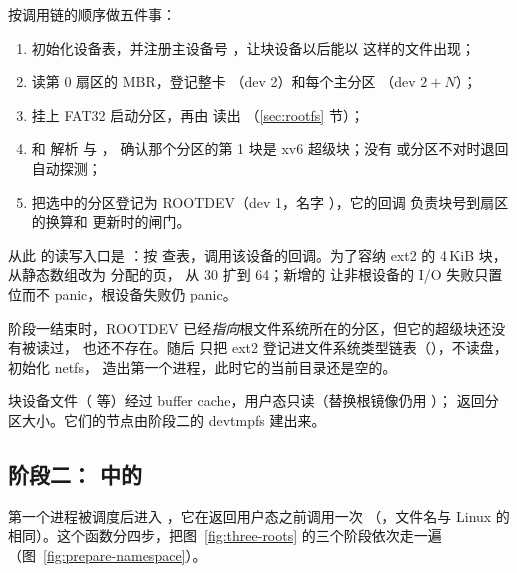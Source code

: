  按调用链的顺序做五件事：

\begin{enumerate}
  \item {} 初始化设备表，并注册主设备号 ，让块设备以后能以  这样的文件出现；
  \item 读第 0 扇区的 MBR，登记整卡 （dev 2）和每个主分区 （dev $2+N$）；
  \item 挂上 FAT32 启动分区，再由  读出 （\ref{sec:rootfs} 节）；
  \item {} 和  解析  与 ， 确认那个分区的第 1 块是 xv6 超级块；没有  或分区不对时退回自动探测；
  \item {} 把选中的分区登记为 ROOTDEV（dev 1，名字 ），它的回调  负责块号到扇区的换算和  更新时的闸门。
\end{enumerate}

从此  的读写入口是 ：按  查表，调用该设备的回调。为了容纳 ext2 的 4\,KiB 块， 从静态数组改为  分配的页， 从 30 扩到 64；新增的  让非根设备的 I/O 失败只置位而不 panic，根设备失败仍 panic。

阶段一结束时，ROOTDEV 已经\emph{指向}根文件系统所在的分区，但它的超级块还没有被读过，\code{/} 也还不存在。随后  只把 ext2 登记进文件系统类型链表（），不读盘， 初始化 netfs， 造出第一个进程，此时它的当前目录还是空的。

\begin{note}
  块设备文件（ 等）经过 buffer cache，用户态只读（替换根镜像仍用 ）； 返回分区大小。它们的节点由阶段二的 devtmpfs 建出来。
\end{note}

\subsection{阶段二： 中的 }
\label{sec:ns-stage2}

第一个进程被调度后进入 ，它在返回用户态之前调用一次 （，文件名与 Linux 的  相同）。这个函数分四步，把图~\ref{fig:three-roots} 的三个阶段依次走一遍（图~\ref{fig:prepare-namespace}）。

